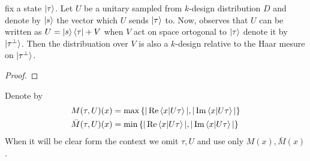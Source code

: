 \documentclass[manuscript,screen,review]{acmart}
\begin{document}
\begin{claim}
  fix a state $\ket{\tau}$. Let $U$ be a unitary sampled from $k$-design
  distribution $D$ and denote by $\ket{s}$ the vector which $U$ sends
  $\ket{\tau}$ to. Now, observes that $U$ can be written as $U =
  \ket{s}\bra{\tau} + V$ when $V$ act on space ortogonal to $ \ket{\tau}$ denote
  it by $\ket{\tau^{\perp}}$. Then the distribuation over $V$ is also a
  $k$-design relative to the Haar mesure on $\ket{\tau^{\perp}}$.
\end{claim}
\begin{proof}
\end{proof}

\begin{definition}
  Denote by
  \begin{equation*}
    \begin{split}
      M(\tau,U)(x) & = \max \left\{ |\operatorname{Re} \braket{x|U\tau}|, |\operatorname{Im}
      \braket{x|U\tau}| \right\} \\
      \bar{M}(\tau,U)(x) & = \min \left\{ |\operatorname{Re} \braket{x|U\tau}|, |\operatorname{Im}
      \braket{x|U\tau}| \right\}
    \end{split}
  \end{equation*}
  When it will be clear form the context we omit $\tau,U$ and use only $M(x),
  \bar{M}(x)$.
\end{definition}
\end{document}
